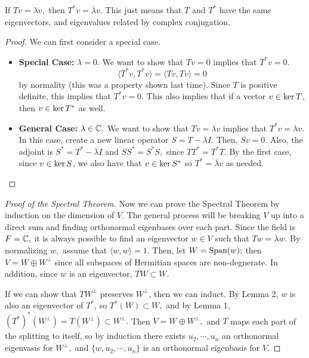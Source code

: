 \begin{lemma}[Lemma 2]
If $Tv = \lambda v,$ then $T^*v = \overline{\lambda}v.$
This just means that $T$ and $T^*$ have the same eigenvectors, and eigenvalues related by complex conjugation.
\end{lemma}
\begin{proof}
We can first consider a special case.
\begin{itemize}
    \item \textbf{Special Case:} $\lambda = 0.$ We want to show that $Tv=0$ implies that $T^*v = 0$.
    \[
    \langle T^*v, T^*v \rangle = \langle Tv, Tv \rangle = 0
    \]
    by normality (this was a property shown last time). 
    Since $T$ is positive definite, this implies that $T^*v = 0.$  
    This also implies that if a vector $v \in \operatorname{ker} T$, then $v \in \operatorname{ker} T^*$ as well.
    \item \textbf{General Case:} $\lambda \in \mathbb C.$ We want to show that $Tv = \lambda v$ implies that $T^*v = \lambda v$. In this case, create a new linear operator $S = T - \lambda I.$ Then, $Sv = 0.$ Also, the adjoint is $S^* = T^* - \overline{\lambda}I$ and $SS^* = S^*S,$ since $TT^* = T^*T.$ %
    By the first case, since $v\in \operatorname{ker} S$, we also have that $v \in \operatorname{ker} S^*$ so $T^* = \overline{\lambda} v$ as needed.
\end{itemize}
\end{proof}

\begin{proof}[Proof of the Spectral Theorem]
Now we can prove the Spectral Theorem by induction on the dimension of $V.$ The general process will be breaking $V$ up into a direct sum and finding orthonormal eigenbases over each part.
Since the field is $F = \mathbb C,$ it is always possible to find an eigenvector $w \in V$ such that $Tw = \lambda w.$ By normalizing $w,$ assume that $\langle w, w \rangle = 1.$ Then, let $W = \text{Span}(w);$ then $V = W \oplus W^\perp$ since all subspaces of Hermitian spaces are non-degnerate. In addition, since $w$ is an eigenvector, $TW \subset W.$ 

If we can show that $TW^\perp$ preserves $W^\perp$, then we can induct.
By Lemma 2, $w$ is also an eigenvector of $T^*$, so $T^*(W) \subset W,$ and by Lemma 1, $(T^*)^*(W^\perp) = T(W^\perp) \subset W^\perp.$ Then $V = W \oplus W^\perp,$ and $T$ maps each part of the splitting to itself, so by induction there exists $u_2, \cdots, u_n$ an orthonormal eigenvasis for $W^\perp,$ and $\{w, u_2, \cdots, u_n\}$ is an orthonormal eigenbasis for $V.$ 
\end{proof}

